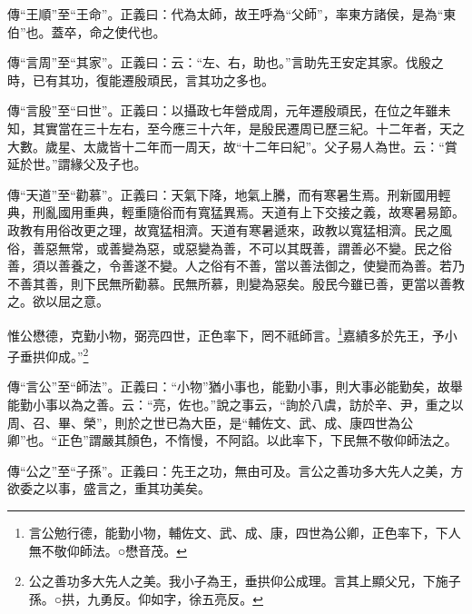 {\noindent\zhuan{}\fzbyks 傳“王順”至“王命”。正義曰：代為太師，故王呼為“父師”，率東方諸侯，是為“東伯”也。蓋卒，命之使代也。 \par}

{\noindent\zhuan{}\fzbyks 傳“言周”至“其家”。正義曰：云：“左、右，助也。”言助先王安定其家。伐殷之時，已有其功，復能遷殷頑民，言其功之多也。 \par}

{\noindent\zhuan{}\fzbyks 傳“言殷”至“曰世”。正義曰：以攝政七年營成周，元年遷殷頑民，在位之年雖未知，其實當在三十左右，至今應三十六年，是殷民遷周已歷三紀。十二年者，天之大數。歲星、太歲皆十二年而一周天，故“十二年曰紀”。父子易人為世。云：“賞延於世。”謂緣父及子也。 \par}

{\noindent\zhuan{}\fzbyks 傳“天道”至“勸慕”。正義曰：天氣下降，地氣上騰，而有寒暑生焉。刑新國用輕典，刑亂國用重典，輕重隨俗而有寬猛異焉。天道有上下交接之義，故寒暑易節。政教有用俗改更之理，故寬猛相濟。天道有寒暑遞來，政教以寬猛相濟。民之風俗，善惡無常，或善變為惡，或惡變為善，不可以其既善，謂善必不變。民之俗善，須以善養之，令善遂不變。人之俗有不善，當以善法御之，使變而為善。若乃不善其善，則下民無所勸慕。民無所慕，則變為惡矣。殷民今雖已善，更當以善教之。欲以屈之意。 \par}

惟公懋德，克勤小物，弼亮四世，正色率下，罔不祗師言。\footnote{言公勉行德，能勤小物，輔佐文、武、成、康，四世為公卿，正色率下，下人無不敬仰師法。○懋音茂。}嘉績多於先王，予小子垂拱仰成。”\footnote{公之善功多大先人之美。我小子為王，垂拱仰公成理。言其上顯父兄，下施子孫。○拱，九勇反。仰如字，徐五亮反。}

{\noindent\zhuan{}\fzbyks 傳“言公”至“師法”。正義曰：“小物”猶小事也，能勤小事，則大事必能勤矣，故舉能勤小事以為之善。云：“亮，佐也。”說之事云，“詢於八虞，訪於辛、尹，重之以周、召、畢、榮”，則於之世已為大臣，是“輔佐文、武、成、康四世為公卿”也。“正色”謂嚴其顏色，不惰慢，不阿諂。以此率下，下民無不敬仰師法之。 \par}

{\noindent\zhuan{}\fzbyks 傳“公之”至“子孫”。正義曰：先王之功，無由可及。言公之善功多大先人之美，方欲委之以事，盛言之，重其功美矣。 \par}

